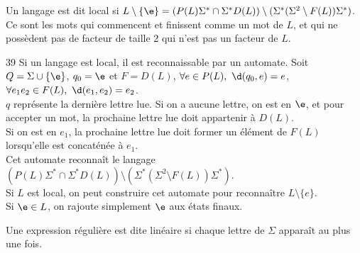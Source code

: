 \documentclass[french, 11pt]{article}
\renewcommand*{\S}{\Sigma}
\begin{document}
\begin{defi}{}{}
    Un langage est dit local si $L\setminus\{\e\}=(P(L)\S^*\cap\S^*D(L)) \setminus (\S^*(\S^2\setminus F(L))\S^*)$.\\
    Ce sont les mots qui commencent et finissent comme un mot de $L$, et qui ne possèdent pas de facteur de taille 2 qui n'est pas un facteur de $L$.
\end{defi}

\vspace*{0.3cm}

\begin{prop}{}{39}
    Si un langage est local, il est reconnaissable par un automate.
    \tcblower
    Soit $Q=\S\cup\{\e\}$, $q_0=\e$ et $F=D(L)$, $\forall e \in P(L), ~ \d(q_0,e)=e$, $\forall e_1e_2\in F(L), ~ \d(e_1,e_2)=e_2$.\\
    $q$ représente la dernière lettre lue. Si on a aucune lettre, on est en $\e$, et pour accepter un mot, la prochaine lettre lue doit appartenir à $D(L)$.\\
    Si on est en $e_1$, la prochaine lettre lue doit former un élément de $F(L)$ lorsqu'elle est concaténée à $e_1$.\\
    Cet automate reconnaît le langage $(P(L)\S^*\cap\S^*D(L))\setminus(\S^*(\S^2\setminus F(L))\S^*)$.\\
    Si $L$ est local, on peut construire cet automate pour reconnaître $L\setminus\{e\}$.\\
    Si $\e\in L$, on rajoute simplement $\e$ aux états finaux.
\end{prop}

\vspace*{0.3cm}

\begin{defi}{}{}
    Une expression régulière est dite linéaire si chaque lettre de $\S$ apparaît au plus une fois.
\end{defi}
\end{document}
